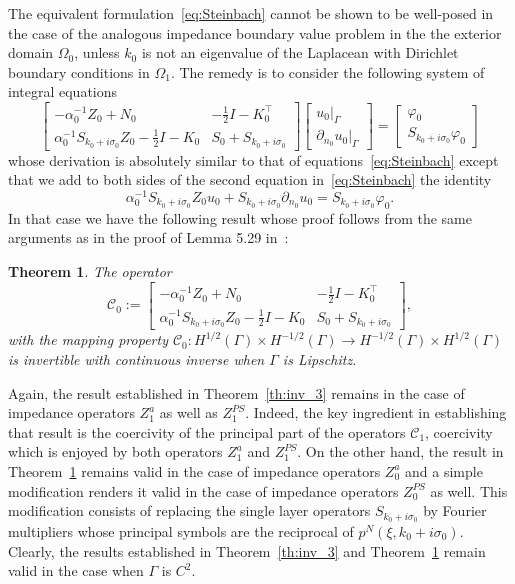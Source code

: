 \documentclass[11pt]{article}
\numberwithin{equation}{section}
\newtheorem{theorem}{Theorem}[section]
\begin{document}
The equivalent formulation~\eqref{eq:Steinbach} cannot be shown to be well-posed in the case of the analogous impedance boundary value problem in the the exterior domain $\Omega_0$, unless $k_0$ is not an eigenvalue of the Laplacean with Dirichlet boundary conditions in $\Omega_1$. The remedy is to consider the following system of integral equations
\begin{equation}\label{eq:Steinbach0}
  \begin{bmatrix}-\alpha_0^{-1}Z_0+N_0 & -\frac{1}{2}I-K_0^\top\\ \alpha_0^{-1}S_{k_0+i\sigma_0}Z_0-\frac{1}{2}I - K_0 & S_0 + S_{k_0+i\sigma_0} \end{bmatrix} \begin{bmatrix}u_0|_\Gamma\\\partial_{n_0}u_0|_\Gamma\end{bmatrix} =\begin{bmatrix}\varphi_0\\S_{k_0+i\sigma_0}\varphi_0\end{bmatrix}
\end{equation}
whose derivation is absolutely similar to that of equations~\eqref{eq:Steinbach} except that we add to both sides of the second equation in~\eqref{eq:Steinbach} the identity
\[
\alpha_0^{-1}S_{k_0+i\sigma_0}Z_0u_0+S_{k_0+i\sigma_0}\partial_{n_0}u_0=S_{k_0+i\sigma_0}\varphi_0.
\]
In that case we have the following result whose proof follows from the same arguments as in the proof of Lemma 5.29 in~\cite{windisch2011boundary}:
\begin{theorem}\label{th:inv_4}
  The operator
  \[
  \mathcal{C}_0:=\begin{bmatrix}-\alpha_0^{-1}Z_0+N_0 & -\frac{1}{2}I-K_0^\top\\ \alpha_0^{-1}S_{k_0+i\sigma_0}Z_0-\frac{1}{2}I - K_0 & S_0 + S_{k_0+i\sigma_0} \end{bmatrix}, 
    \]
with the mapping property  $\mathcal{C}_0: H^{1/2}(\Gamma)\times H^{-1/2}(\Gamma)\to H^{-1/2}(\Gamma)\times H^{1/2}(\Gamma)$ is invertible with continuous inverse when $\Gamma$ is Lipschitz. 
\end{theorem}

Again, the result established in Theorem~\ref{th:inv_3} remains in the case of impedance operators $Z_1^a$ as well as $Z_1^{PS}$. Indeed, the key ingredient in establishing that result is the coercivity of the principal part of the operators $\mathcal{C}_1$, coercivity which is enjoyed by both operators $Z_1^a$ and $Z_1^{PS}$. On the other hand, the result in Theorem~\ref{th:inv_4} remains valid in the case of impedance operators $Z_0^a$ and a simple modification renders it valid in the case of impedance operators $Z_0^{PS}$ as well. This modification consists of replacing the single layer operators $S_{k_0+i\sigma_0}$ by Fourier multipliers whose principal symbols are the reciprocal of $p^N(\xi, k_0+i\sigma_0)$. Clearly, the results established in Theorem~\ref{th:inv_3} and Theorem~\ref{th:inv_4} remain valid in the case when $\Gamma$ is $C^2$.
\end{document}
